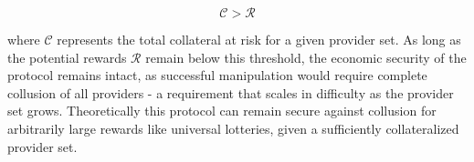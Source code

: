 \begin{equation}
\mathcal{C} > \mathcal{R}
\end{equation}

where $\mathcal{C}$ represents the total collateral at risk for a given provider set. As long as the potential rewards $\mathcal{R}$ remain below this threshold, the economic security of the protocol remains intact, as successful manipulation would require complete collusion of all providers - a requirement that scales in difficulty as the provider set grows. Theoretically this protocol can remain secure against collusion for arbitrarily large rewards like universal lotteries, given a sufficiently collateralized provider set.
